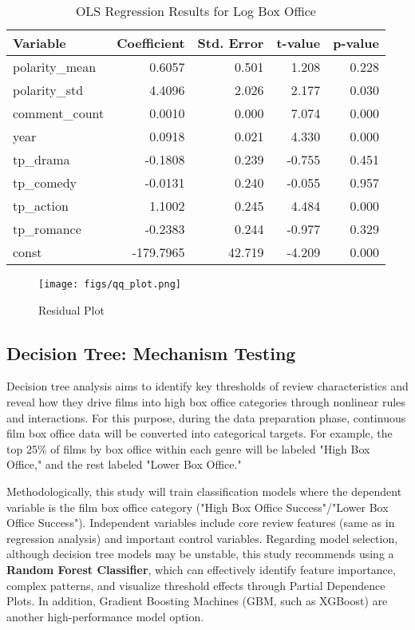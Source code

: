 \documentclass{article}
\begin{document}
\begin{table}[htbp]
\centering
\caption{OLS Regression Results for Log Box Office}
\label{tab:mlr_res}
\begin{tabular}{lrrrr}
\toprule
\textbf{Variable} & \textbf{Coefficient} & \textbf{Std. Error} & \textbf{t-value} & \textbf{p-value} \\
\midrule
polarity\_mean & 0.6057 & 0.501 & 1.208 & 0.228 \\
polarity\_std & 4.4096 & 2.026 & 2.177 & 0.030 \\
comment\_count & 0.0010 & 0.000 & 7.074 & 0.000 \\
year & 0.0918 & 0.021 & 4.330 & 0.000 \\
tp\_drama & -0.1808 & 0.239 & -0.755 & 0.451 \\
tp\_comedy & -0.0131 & 0.240 & -0.055 & 0.957 \\
tp\_action & 1.1002 & 0.245 & 4.484 & 0.000 \\
tp\_romance & -0.2383 & 0.244 & -0.977 & 0.329 \\
const & -179.7965 & 42.719 & -4.209 & 0.000 \\
\bottomrule
\end{tabular}
\end{table}

\begin{figure}[H]
\centering
\texttt{[image: figs/qq\_plot.png]} %
\caption{Residual Plot}
\label{fig:mlr_qq}
\end{figure}

\subsection{Decision Tree: Mechanism Testing}
Decision tree analysis aims to identify key thresholds of review characteristics and reveal how they drive films into high box office categories through nonlinear rules and interactions. For this purpose, during the data preparation phase, continuous film box office data will be converted into categorical targets. For example, the top 25\% of films by box office within each genre will be labeled "High Box Office," and the rest labeled "Lower Box Office."

Methodologically, this study will train classification models where the dependent variable is the film box office category ("High Box Office Success"/"Lower Box Office Success"). Independent variables include core review features (same as in regression analysis) and important control variables. Regarding model selection, although decision tree models may be unstable, this study recommends using a \textbf{Random Forest Classifier}, which can effectively identify feature importance, complex patterns, and visualize threshold effects through Partial Dependence Plots. In addition, Gradient Boosting Machines (GBM, such as XGBoost) are another high-performance model option.
\end{document}
